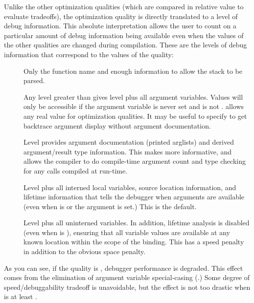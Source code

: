 Unlike the other optimization qualities (which are compared in relative value
to evaluate tradeoffs), the  optimization quality is directly
translated to a level of debug information.  This absolute interpretation
allows the user to count on a particular amount of debug information being
available even when the values of the other qualities are changed during
compilation.  These are the levels of debug information that correspond to the
values of the  quality:
\begin{description}

\item[]
Only the function name and enough information to allow the stack to
be parsed.

\item[]
Any level greater than  gives level  plus all
argument variables.  Values will only be accessible if the argument
variable is never set and
 is not .  \cmucl{} allows any real value for optimization
qualities.  It may be useful to specify  to get backtrace argument
display without argument documentation.

\item[] Level  provides argument documentation
(printed arglists) and derived argument/result type information.
This makes  more informative, and allows the
compiler to do compile-time argument count and type checking for any
calls compiled at run-time.

\item[]
Level  plus all interned local variables, source location
information, and lifetime information that tells the debugger when arguments
are available (even when  is  or the argument is set.)  This is
the default.

\item[]
Level  plus all uninterned variables.  In addition, lifetime
analysis is disabled (even when  is ), ensuring that all variable
values are available at any known location within the scope of the binding.
This has a speed penalty in addition to the obvious space penalty.
\end{description}

As you can see, if the  quality is , debugger performance is
degraded.  This effect comes from the elimination of argument variable
special-casing (.)  Some degree of
speed/debuggability tradeoff is unavoidable, but the effect is not too drastic
when  is at least .

